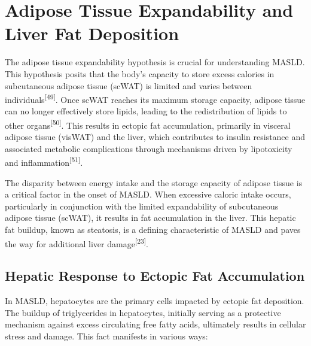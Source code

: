 \documentclass[
  11pt,
  letterpaper,
]{book}
\begin{document}
\section{Adipose Tissue Expandability and Liver Fat
Deposition}\label{adipose-tissue-expandability-and-liver-fat-deposition}

The adipose tissue expandability hypothesis is crucial for understanding
MASLD. This hypothesis posits that the body's capacity to store excess
calories in subcutaneous adipose tissue (scWAT) is limited and varies
between individuals\textsuperscript{{[}49{]}}. Once scWAT reaches its
maximum storage capacity, adipose tissue can no longer effectively store
lipids, leading to the redistribution of lipids to other
organs\textsuperscript{{[}50{]}}. This results in ectopic fat
accumulation, primarily in visceral adipose tissue (visWAT) and the
liver, which contributes to insulin resistance and associated metabolic
complications through mechanisms driven by lipotoxicity and
inflammation\textsuperscript{{[}51{]}}.

The disparity between energy intake and the storage capacity of adipose
tissue is a critical factor in the onset of MASLD. When excessive
caloric intake occurs, particularly in conjunction with the limited
expandability of subcutaneous adipose tissue (scWAT), it results in fat
accumulation in the liver. This hepatic fat buildup, known as steatosis,
is a defining characteristic of MASLD and paves the way for additional
liver damage\textsuperscript{{[}23{]}}.

\subsection{Hepatic Response to Ectopic Fat
Accumulation}\label{hepatic-response-to-ectopic-fat-accumulation}

In MASLD, hepatocytes are the primary cells impacted by ectopic fat
deposition. The buildup of triglycerides in hepatocytes, initially
serving as a protective mechanism against excess circulating free fatty
acids, ultimately results in cellular stress and damage. This fact
manifests in various ways:
\end{document}

